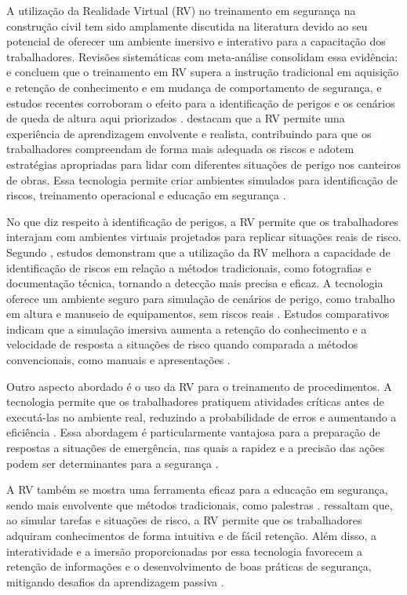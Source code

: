 A utilização da Realidade Virtual (RV) no treinamento em segurança na construção civil tem sido amplamente discutida na literatura devido ao seu potencial de oferecer um ambiente imersivo e interativo para a capacitação dos trabalhadores. Revisões sistemáticas com meta-análise consolidam essa evidência:  e  concluem que o treinamento em RV supera a instrução tradicional em aquisição e retenção de conhecimento e em mudança de comportamento de segurança, e estudos recentes corroboram o efeito para a identificação de perigos e os cenários de queda de altura aqui priorizados \cite{guo2024,alzarrad2024}.  destacam que a RV permite uma experiência de aprendizagem envolvente e realista, contribuindo para que os trabalhadores compreendam de forma mais adequada os riscos e adotem estratégias apropriadas para lidar com diferentes situações de perigo nos canteiros de obras. Essa tecnologia permite criar ambientes simulados para identificação de riscos, treinamento operacional e educação em segurança \cite{zhou2019,wang2020,akindele2024}.

No que diz respeito à identificação de perigos, a RV permite que os trabalhadores interajam com ambientes virtuais projetados para replicar situações reais de risco. Segundo , estudos demonstram que a utilização da RV melhora a capacidade de identificação de riscos em relação a métodos tradicionais, como fotografias e documentação técnica, tornando a detecção mais precisa e eficaz. A tecnologia oferece um ambiente seguro para simulação de cenários de perigo, como trabalho em altura e manuseio de equipamentos, sem riscos reais \cite{li2018,sacks2019,akindele2024}. Estudos comparativos indicam que a simulação imersiva aumenta a retenção do conhecimento e a velocidade de resposta a situações de risco quando comparada a métodos convencionais, como manuais e apresentações \cite{bhoir2015,akindele2024}.

Outro aspecto abordado é o uso da RV para o treinamento de procedimentos. A tecnologia permite que os trabalhadores pratiquem atividades críticas antes de executá-las no ambiente real, reduzindo a probabilidade de erros e aumentando a eficiência \cite[p.~10]{akindele2024}. Essa abordagem é particularmente vantajosa para a preparação de respostas a situações de emergência, nas quais a rapidez e a precisão das ações podem ser determinantes para a segurança \cite{fang2016,guo2017,akindele2024}.

A RV também se mostra uma ferramenta eficaz para a educação em segurança, sendo mais envolvente que métodos tradicionais, como palestras \cite{sacks2013,guo2017}.  ressaltam que, ao simular tarefas e situações de risco, a RV permite que os trabalhadores adquiram conhecimentos de forma intuitiva e de fácil retenção. Além disso, a interatividade e a imersão proporcionadas por essa tecnologia favorecem a retenção de informações e o desenvolvimento de boas práticas de segurança, mitigando desafios da aprendizagem passiva \cite{akindele2024}.

